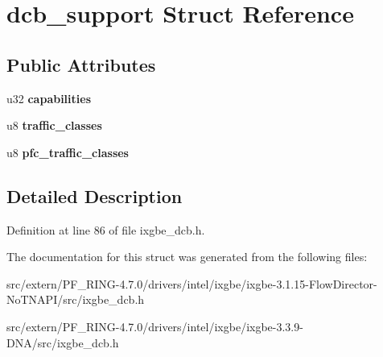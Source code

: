 \hypertarget{structdcb__support}{
\section{dcb\_\-support Struct Reference}
\label{structdcb__support}
}
\subsection*{Public Attributes}
\begin{DoxyCompactItemize}
\item 
\hypertarget{structdcb__support_aeca251b71cd9ee870ff94694e737fe76}{
u32 {\bfseries capabilities}}
\label{structdcb__support_aeca251b71cd9ee870ff94694e737fe76}

\item 
\hypertarget{structdcb__support_a94032dd60b73c9ae4bce14c449f0f6d4}{
u8 {\bfseries traffic\_\-classes}}
\label{structdcb__support_a94032dd60b73c9ae4bce14c449f0f6d4}

\item 
\hypertarget{structdcb__support_a8f0cf83f117cdaa06b418798a6e08fba}{
u8 {\bfseries pfc\_\-traffic\_\-classes}}
\label{structdcb__support_a8f0cf83f117cdaa06b418798a6e08fba}

\end{DoxyCompactItemize}


\subsection{Detailed Description}


Definition at line 86 of file ixgbe\_\-dcb.h.



The documentation for this struct was generated from the following files:\begin{DoxyCompactItemize}
\item 
src/extern/PF\_\-RING-\/4.7.0/drivers/intel/ixgbe/ixgbe-\/3.1.15-\/FlowDirector-\/NoTNAPI/src/ixgbe\_\-dcb.h\item 
src/extern/PF\_\-RING-\/4.7.0/drivers/intel/ixgbe/ixgbe-\/3.3.9-\/DNA/src/ixgbe\_\-dcb.h\end{DoxyCompactItemize}
